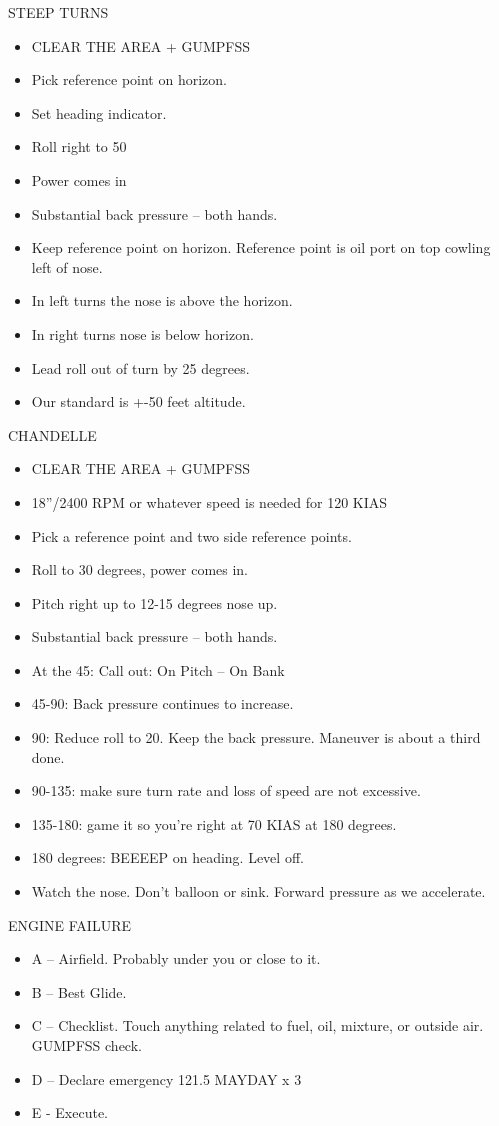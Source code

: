 STEEP TURNS
\begin{itemize}
    \item CLEAR THE AREA + GUMPFSS
    \item Pick reference point on horizon.
    \item Set heading indicator.
    \item Roll right to 50
    \item Power comes in
    \item Substantial back pressure – both hands.
    \item Keep reference point on horizon. Reference point is oil port on top cowling left of nose.
    \item In left turns the nose is above the horizon.
    \item In right turns nose is below horizon.
    \item Lead roll out of turn by 25 degrees.
    \item Our standard is +-50 feet altitude.
\end{itemize}

CHANDELLE
\begin{itemize}
    \item CLEAR THE AREA + GUMPFSS
    \item 18”/2400 RPM or whatever speed is needed for 120 KIAS
    \item Pick a reference point and two side reference points.
    \item Roll to 30 degrees, power comes in.
    \item Pitch right up to 12-15 degrees nose up.
    \item Substantial back pressure – both hands.
    \item At the 45: Call out: On Pitch – On Bank
    \item 45-90: Back pressure continues to increase.
    \item 90: Reduce roll to 20. Keep the back pressure. Maneuver is about a third done.
    \item 90-135: make sure turn rate and loss of speed are not excessive.
    \item 135-180: game it so you’re right at 70 KIAS at 180 degrees.
    \item 180 degrees: BEEEEP on heading. Level off.
    \item Watch the nose. Don’t balloon or sink. Forward pressure as we accelerate.
\end{itemize}

ENGINE FAILURE
\begin{itemize}
    \item A – Airfield. Probably under you or close to it.
    \item B – Best Glide.
    \item C – Checklist. Touch anything related to fuel, oil, mixture, or outside air. GUMPFSS check.
    \item D – Declare emergency 121.5 MAYDAY x 3
    \item E - Execute.
\end{itemize}

